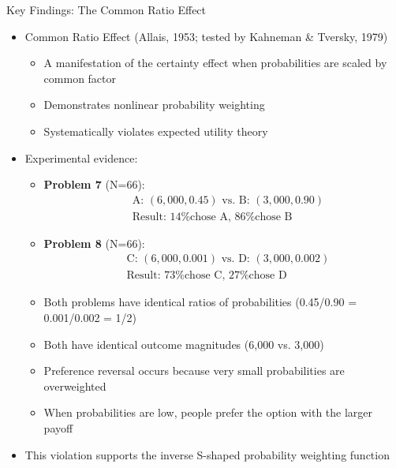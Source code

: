 \documentclass[10pt]{beamer}
\begin{document}
\begin{frame}{Key Findings: The Common Ratio Effect}
  \begin{itemize}[<+->]
    \item Common Ratio Effect (Allais, 1953; tested by Kahneman \& Tversky, 1979)
      \begin{itemize}
        \item A manifestation of the certainty effect when probabilities are scaled by common factor
        \item Demonstrates nonlinear probability weighting
        \item Systematically violates expected utility theory
      \end{itemize}
    \item Experimental evidence:
      \begin{itemize}
        \item \textbf{Problem 7} (N=66):
          \begin{align*}
            &\text{A: } (6,000, 0.45) \text{ vs. B: } (3,000, 0.90)\\
            &\text{Result: 14\% chose A, 86\% chose B}
          \end{align*}
        \item \textbf{Problem 8} (N=66):
          \begin{align*}
            &\text{C: } (6,000, 0.001) \text{ vs. D: } (3,000, 0.002)\\
            &\text{Result: 73\% chose C, 27\% chose D}
          \end{align*}
        \item Both problems have identical ratios of probabilities (0.45/0.90 = 0.001/0.002 = 1/2)
        \item Both have identical outcome magnitudes (6,000 vs. 3,000)
        \item Preference reversal occurs because very small probabilities are overweighted
        \item When probabilities are low, people prefer the option with the larger payoff
      \end{itemize}
    \item This violation supports the inverse S-shaped probability weighting function
  \end{itemize}
\end{frame}
\end{document}
